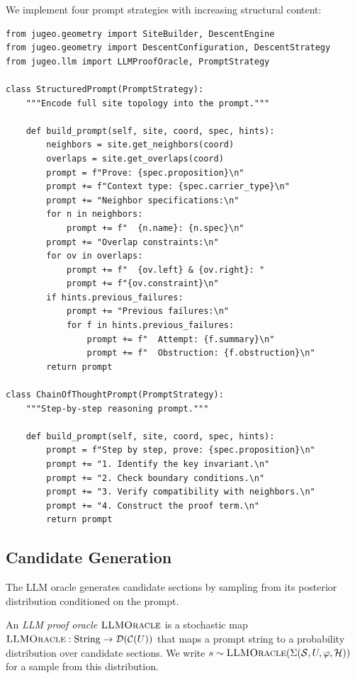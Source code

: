 \documentclass[11pt]{article}
\newcommand{\LLMOracle}{\textsc{LLMOracle}}
\newcommand{\CandSpace}{\mathcal{C}}
\newcommand{\PromptStrat}{\Sigma}
\newcommand{\HintBundle}{\mathcal{H}}
\begin{document}
We implement four prompt strategies with increasing structural content:

\begin{lstlisting}[style=jugeo-python,caption={Prompt strategy implementations.}]
from jugeo.geometry import SiteBuilder, DescentEngine
from jugeo.geometry import DescentConfiguration, DescentStrategy
from jugeo.llm import LLMProofOracle, PromptStrategy

class StructuredPrompt(PromptStrategy):
    """Encode full site topology into the prompt."""

    def build_prompt(self, site, coord, spec, hints):
        neighbors = site.get_neighbors(coord)
        overlaps = site.get_overlaps(coord)
        prompt = f"Prove: {spec.proposition}\n"
        prompt += f"Context type: {spec.carrier_type}\n"
        prompt += "Neighbor specifications:\n"
        for n in neighbors:
            prompt += f"  {n.name}: {n.spec}\n"
        prompt += "Overlap constraints:\n"
        for ov in overlaps:
            prompt += f"  {ov.left} & {ov.right}: "
            prompt += f"{ov.constraint}\n"
        if hints.previous_failures:
            prompt += "Previous failures:\n"
            for f in hints.previous_failures:
                prompt += f"  Attempt: {f.summary}\n"
                prompt += f"  Obstruction: {f.obstruction}\n"
        return prompt

class ChainOfThoughtPrompt(PromptStrategy):
    """Step-by-step reasoning prompt."""

    def build_prompt(self, site, coord, spec, hints):
        prompt = f"Step by step, prove: {spec.proposition}\n"
        prompt += "1. Identify the key invariant.\n"
        prompt += "2. Check boundary conditions.\n"
        prompt += "3. Verify compatibility with neighbors.\n"
        prompt += "4. Construct the proof term.\n"
        return prompt
\end{lstlisting}

\subsection{Candidate Generation}\label{subsec:candidate-gen}

The LLM oracle generates candidate sections by sampling from its
posterior distribution conditioned on the prompt.

\begin{definition}\label{def:llm-oracle}
An \emph{LLM proof oracle} $\LLMOracle$ is a stochastic map
$\LLMOracle : \mathrm{String} \to \mathcal{D}(\CandSpace(U))$ that
maps a prompt string to a probability distribution over candidate
sections.  We write $s \sim \LLMOracle(\PromptStrat(\Site, U, \prop, \HintBundle))$
for a sample from this distribution.
\end{definition}
\end{document}
